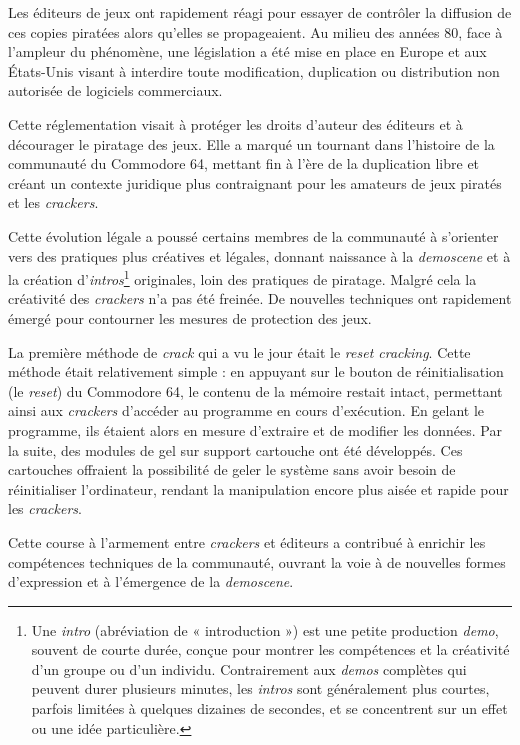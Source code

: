 Les éditeurs de jeux ont rapidement réagi pour essayer de contrôler la diffusion de ces copies piratées alors qu'elles se propageaient. Au milieu des années 80, face à l'ampleur du phénomène, une législation a été mise en place en Europe et aux États-Unis visant à interdire toute modification, duplication ou distribution non autorisée de logiciels commerciaux.

Cette réglementation visait à protéger les droits d'auteur des éditeurs et à décourager le piratage des jeux. Elle a marqué un tournant dans l'histoire de la communauté du Commodore 64, mettant fin à l'ère de la duplication libre et créant un contexte juridique plus contraignant pour les amateurs de jeux piratés et les \textit{crackers}.

Cette évolution légale a poussé certains membres de la communauté à s'orienter vers des pratiques plus créatives et légales, donnant naissance à la \textit{demoscene} et à la création d'\textit{intros}\footnote{Une \textit{intro} (abréviation de « introduction ») est une petite production \textit{demo}, souvent de courte durée, conçue pour montrer les compétences et la créativité d'un groupe ou d'un individu. Contrairement aux \textit{demos} complètes qui peuvent durer plusieurs minutes, les \textit{intros} sont généralement plus courtes, parfois limitées à quelques dizaines de secondes, et se concentrent sur un effet ou une idée particulière.} originales, loin des pratiques de piratage. Malgré cela la créativité des \textit{crackers} n'a pas été freinée. De nouvelles techniques ont rapidement émergé pour contourner les mesures de protection des jeux.

La première méthode de \textit{crack} qui a vu le jour était le \textit{reset cracking}. Cette méthode était relativement simple : en appuyant sur le bouton de réinitialisation (le \textit{reset}) du Commodore 64, le contenu de la mémoire restait intact, permettant ainsi aux \textit{crackers} d'accéder au programme en cours d'exécution. En gelant le programme, ils étaient alors en mesure d'extraire et de modifier les données. Par la suite, des modules de gel sur support cartouche ont été développés. Ces cartouches offraient la possibilité de geler le système sans avoir besoin de réinitialiser l'ordinateur, rendant la manipulation encore plus aisée et rapide pour les \textit{crackers}.

Cette course à l'armement entre \textit{crackers} et éditeurs a contribué à enrichir les compétences techniques de la communauté, ouvrant la voie à de nouvelles formes d'expression et à l'émergence de la \textit{demoscene}.


